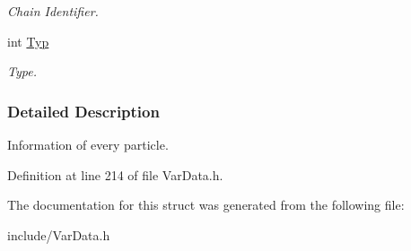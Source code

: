 \begin{DoxyCompactItemize}
\begin{DoxyCompactList}\small\item\em Chain Identifier. \end{DoxyCompactList}\item 
int \hyperlink{structPART_a6365019ac3c6ee60c2db6a3674f35614}{Typ}\hypertarget{structPART_a6365019ac3c6ee60c2db6a3674f35614}{}\label{structPART_a6365019ac3c6ee60c2db6a3674f35614}

\begin{DoxyCompactList}\small\item\em Type. \end{DoxyCompactList}\end{DoxyCompactItemize}


\subsubsection{Detailed Description}
Information of every particle. 

Definition at line 214 of file Var\+Data.\+h.



The documentation for this struct was generated from the following file\+:\begin{DoxyCompactItemize}
\item 
include/Var\+Data.\+h\end{DoxyCompactItemize}
